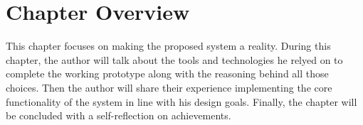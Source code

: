 \section{Chapter Overview}

This chapter focuses on making the proposed system a reality. During this chapter, the author will talk about the tools and technologies he relyed on to complete the working prototype along with the reasoning behind all those choices. Then the author will share their experience implementing the core functionality of the system in line with his design goals. Finally, the chapter will be concluded with a self-reflection on achievements.